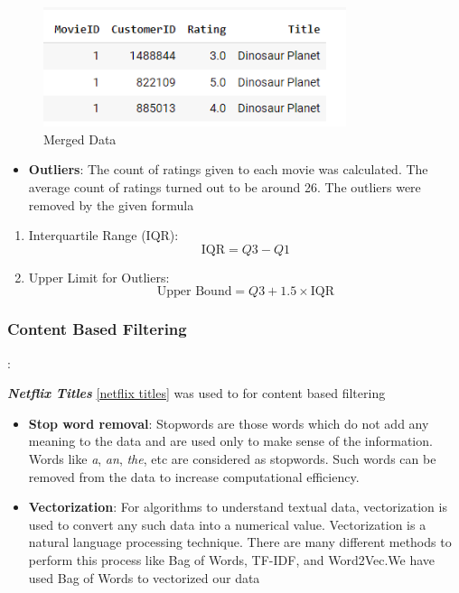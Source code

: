 \documentclass[a4paper,10pt]{article}
\begin{document}
\begin{figure}[H]
\centering
\includegraphics[height=3.5cm]{figures/movie_data.png}
\caption{Merged Data}
\label{Movie_merge}
\end{figure}


\begin{itemize}
    \item \textbf{Outliers}: The count of ratings given to each movie was calculated. The average count of ratings turned out to be around 26. The outliers were removed by the given formula 
\end{itemize}

\begin{enumerate}
  \item Interquartile Range (IQR):
    \[ \text{IQR} = Q3 - Q1 \]

  \item Upper Limit for Outliers:
    \[ \text{Upper Bound} = Q3 + 1.5 \times \text{IQR} \]
\end{enumerate}

\subsubsection{Content Based Filtering}:

\textbf{\textit{Netflix Titles}} \ref{netflix titles} was used to for content based filtering

\begin{itemize}
    \item \textbf{Stop word removal}: Stopwords are those words which do not add any meaning to the data and are used only to make sense of the information. Words like \textit{a}, \textit{an}, \textit{the}, etc are considered as stopwords. Such words can be removed from the data to increase computational efficiency. 
\end{itemize}


\begin{itemize}
    \item \textbf{Vectorization}: For algorithms to understand textual data, vectorization is used to convert any such data into a numerical value. Vectorization is a natural language processing technique. There are many different methods to perform this process like Bag of Words, TF-IDF, and Word2Vec.We have used Bag of Words to vectorized our data
\end{itemize}
\end{document}
